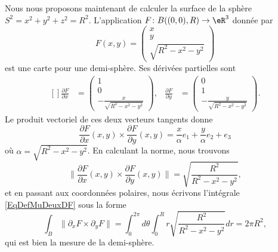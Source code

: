 Nous nous proposons maintenant de calculer la surface de la sphère \( S^2=x^2+y^2+z^2=R^2\). L'application \( F\colon B( (0,0),R)\to \eR^3\) donnée par
\begin{equation}
	F(x,y)=\begin{pmatrix}
		x \\
		y \\
		\sqrt{R^2-x^2-y^2}
	\end{pmatrix}
\end{equation}
est une carte pour une demi-sphère. Ses dérivées partielles sont
\begin{equation}
	\begin{aligned}[]
		\frac{ \partial F }{ \partial x } & =\begin{pmatrix}
			                                     1 \\
			                                     0 \\
			                                     -\frac{ x }{ \sqrt{R^2-x^2-y^2} }
		                                     \end{pmatrix},
		                                  & \frac{ \partial F }{ \partial y }      & =\begin{pmatrix}
			                                                                              0 \\
			                                                                              1 \\
			                                                                              -\frac{ y }{ \sqrt{R^2-x^2-y^2} }
		                                                                              \end{pmatrix}.
	\end{aligned}
\end{equation}
Le produit vectoriel de ces deux vecteurs tangents donne
\begin{equation}
	\frac{ \partial F }{ \partial x }(x,y)\times\frac{ \partial F }{ \partial y }(x,y)=\frac{ x }{ \alpha }e_1+\frac{ y }{ \alpha }e_2+e_3
\end{equation}
où \( \alpha=\sqrt{R^2-x^2-y^2}\). En calculant la norme, nous trouvons
\begin{equation}
	\| \frac{ \partial F }{ \partial x }(x,y)\times\frac{ \partial F }{ \partial y }(x,y)\| =\sqrt{  \frac{ R^2 }{ R^2-x^2-y^2 } },
\end{equation}
et en passant aux coordonnées polaires, nous écrivons l'intégrale \eqref{EqDefMuDeuxDF} sous la forme
\begin{equation}        \label{EQooYGRFooKwEYfV}
	\int_B\| \partial_xF\times\partial_yF \|=\int_0^{2\pi}d\theta\int_0^R r\sqrt{  \frac{ R^2 }{ R^2-x^2-y^2 } }dr=2\pi R^2,
\end{equation}
qui est bien la mesure de la demi-sphère.

